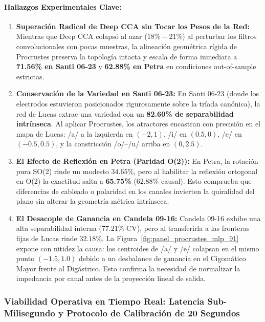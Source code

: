 \documentclass[11pt,a4paper]{article}
\begin{document}
\paragraph{Hallazgos Experimentales Clave:}
\begin{enumerate}
    \item \textbf{Superación Radical de Deep CCA sin Tocar los Pesos de la Red:}
    Mientras que Deep CCA colapsó al azar ($18\% - 21\%$) al perturbar los filtros convolucionales con pocas muestras, la alineación geométrica rígida de Procrustes preserva la topología intacta y escala de forma inmediata a \textbf{71.56\% en Santi 06-23} y \textbf{62.88\% en Petra} en condiciones out-of-sample estrictas.
    \item \textbf{Conservación de la Variedad en Santi 06-23:}
    En Santi 06-23 (donde los electrodos estuvieron posicionados rigurosamente sobre la tríada canónica), la red de Lucas extrae una variedad con un \textbf{82.60\% de separabilidad intrínseca}. Al aplicar Procrustes, los atractores encastran con precisión en el mapa de Lucas: /a/ a la izquierda en $(-2, 1)$, /i/ en $(0.5, 0)$, /e/ en $(-0.5, 0.5)$, y la constricción /o/--/u/ arriba en $(0, 2.5)$.
    \item \textbf{El Efecto de Reflexión en Petra (Paridad O(2)):}
    En Petra, la rotación pura SO(2) rinde un modesto $34.65\%$, pero al habilitar la reflexión ortogonal en O(2) la exactitud salta a \textbf{65.75\%} ($62.88\%$ causal). Esto comprueba que diferencias de cableado o polaridad en los canales invierten la quiralidad del plano sin alterar la geometría métrica intrínseca.
    \item \textbf{El Desacople de Ganancia en Candela 09-16:}
    Candela 09-16 exhibe una alta separabilidad interna ($77.21\%$ CV), pero al transferirla a las fronteras fijas de Lucas rinde $32.18\%$. La Figura~\ref{fig:panel_procrustes_mlp_91} expone con nitidez la causa: los centroides de /a/ y /e/ colapsan en el mismo punto $(-1.5, 1.0)$ debido a un desbalance de ganancia en el Cigomático Mayor frente al Digástrico. Esto confirma la necesidad de normalizar la impedancia por canal antes de la proyección lineal de salida.
\end{enumerate}

\subsubsection{Viabilidad Operativa en Tiempo Real: Latencia Sub-Milisegundo y Protocolo de Calibración de 20 Segundos}
\label{subsubsec:viabilidad_tiempo_real_procrustes}
\end{document}
